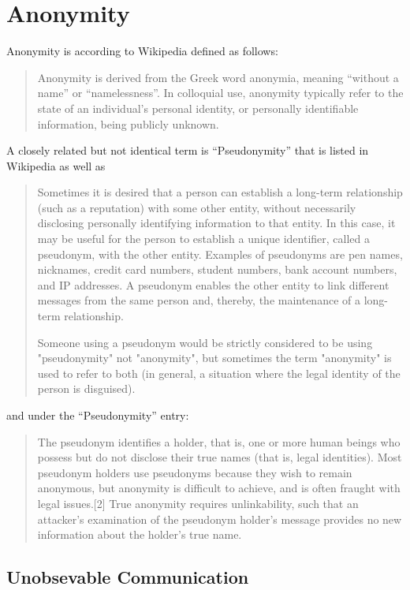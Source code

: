 \section{Anonymity}
Anonymity is according to Wikipedia\cite{wiki:anonymity} defined as follows:
\begin{quote}
Anonymity is derived from the Greek word anonymia, meaning "`without a name"' or "`namelessness"'. In colloquial use, anonymity typically refer to the state of an individual's personal identity, or personally identifiable information, being publicly unknown.
\end{quote}
A closely related but not identical term is "`Pseudonymity"' that is listed in Wikipedia as well as
\begin{quote}
Sometimes it is desired that a person can establish a long-term relationship (such as a reputation) with some other entity, without necessarily disclosing personally identifying information to that entity. In this case, it may be useful for the person to establish a unique identifier, called a pseudonym, with the other entity. Examples of pseudonyms are pen names, nicknames, credit card numbers, student numbers, bank account numbers, and IP addresses. A pseudonym enables the other entity to link different messages from the same person and, thereby, the maintenance of
a long-term relationship. \par
Someone using a pseudonym would be strictly considered to be using "pseudonymity" not "anonymity", but sometimes the term "anonymity" is used to refer to both (in general, a situation where the legal identity of the person is disguised).
\end{quote}
and under the "`Pseudonymity"' \cite{wiki:pseudonymity} entry:
\begin{quote}
The pseudonym identifies a holder, that is, one or more human beings who possess but do not disclose their true names (that is, legal identities). Most pseudonym holders use pseudonyms because they wish to remain anonymous, but anonymity is difficult to achieve, and is often fraught with legal issues.[2] True anonymity requires unlinkability, such that an attacker's examination of the pseudonym holder's message provides no new information about the holder's true name.
\end{quote}

\subsection{Unobsevable Communication}
\cite{ccs2011-cirripede}
